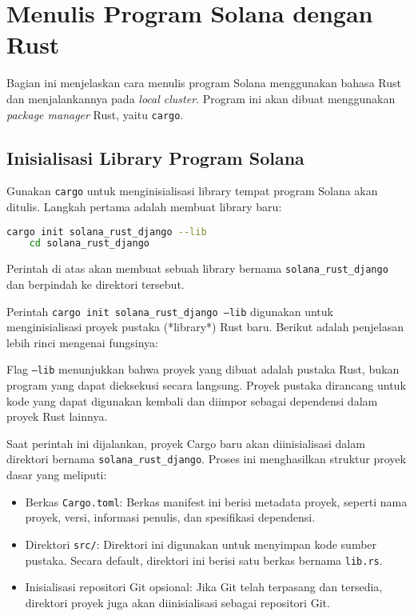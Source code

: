 \chapter{Menulis Program Solana dengan Rust}

Bagian ini menjelaskan cara menulis program Solana menggunakan bahasa Rust dan menjalankannya pada \textit{local cluster}. Program ini akan dibuat menggunakan \textit{package manager} Rust, yaitu \texttt{cargo}.

\section{Inisialisasi Library Program Solana}
Gunakan \texttt{cargo} untuk menginisialisasi library tempat program Solana akan ditulis. Langkah pertama adalah membuat library baru:

\begin{lstlisting}[language=bash]
	cargo init solana_rust_django --lib
	cd solana_rust_django
\end{lstlisting}

Perintah di atas akan membuat sebuah library bernama \texttt{solana\_rust\_django} dan berpindah ke direktori tersebut. 

Perintah \texttt{cargo init solana\_rust\_django --lib} digunakan untuk menginisialisasi proyek pustaka (*library*) Rust baru. Berikut adalah penjelasan lebih rinci mengenai fungsinya:

Flag \texttt{--lib} menunjukkan bahwa proyek yang dibuat adalah pustaka Rust, bukan program yang dapat dieksekusi secara langsung. Proyek pustaka dirancang untuk kode yang dapat digunakan kembali dan diimpor sebagai dependensi dalam proyek Rust lainnya.

Saat perintah ini dijalankan, proyek Cargo baru akan diinisialisasi dalam direktori bernama \texttt{solana\_rust\_django}. Proses ini menghasilkan struktur proyek dasar yang meliputi:
\begin{itemize}
	\item Berkas \texttt{Cargo.toml}: Berkas manifest ini berisi metadata proyek, seperti nama proyek, versi, informasi penulis, dan spesifikasi dependensi.
	\item Direktori \texttt{src/}: Direktori ini digunakan untuk menyimpan kode sumber pustaka. Secara default, direktori ini berisi satu berkas bernama \texttt{lib.rs}.
	\item Inisialisasi repositori Git opsional: Jika Git telah terpasang dan tersedia, direktori proyek juga akan diinisialisasi sebagai repositori Git.
\end{itemize}

